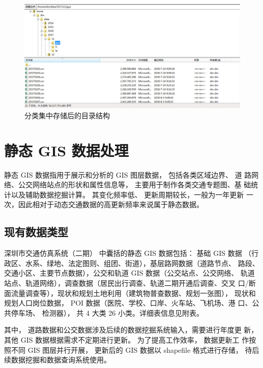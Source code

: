 \clearpage
\begin{figure}[!ht]
  \centering
  \includegraphics[width=\textwidth]{figures/chp02_分类集中存储后的目录结构.jpg}
  \caption{分类集中存储后的目录结构\label{fig:分类集中存储后的目录结构}} 
\end{figure}

\section{静态 GIS 数据处理} \label{sec:静态GIS数据处理}
静态 GIS 数据指用于展示和分析的 GIS 图层数据， 包括各类区域边界、 道
路网络、公交网络站点的形状和属性信息等， 主要用于制作各类交通专题图、基
础统计以及辅助数据挖掘计算。 其变化频率低、 更新周期较长，一般为一年更新
一次，因此相对于动态交通数据的高更新频率来说属于静态数据。

\subsection{现有数据类型} \label{sec:现有数据类型}
深圳市交通仿真系统（二期） 中囊括的静态 GIS 数据包括： 基础 GIS 数据
（行政区、水系、绿地、法定图则、组团、街道），基层路网数据（道路节点、
路段、交通小区、主要节点数据），公交和轨道 GIS 数据（公交站点、公交网络、
轨道站点、轨道网络），调查数据（居民出行调查、轨道二期开通后调查、交叉
口/断面流量调查等），现状和规划土地利用（建筑物普查数据、规划一张图），
现状和规划人口岗位数据， POI 数据（医院、学校、口岸、火车站、飞机场、港
口、公共停车场、 检测器）， 共 4 大类 26 小类。详细表信息见附表。

其中， 道路数据和公交数据涉及后续的数据挖掘系统输入，需要进行年度更
新，其他 GIS 数据根据需求不定期进行更新。 为了提高工作效率， 数据更新工
作按照不同 GIS 图层并行开展， 更新后的 GIS 数据以 shapefile 格式进行存储，
待后续数据挖掘和数据查询系统使用。


